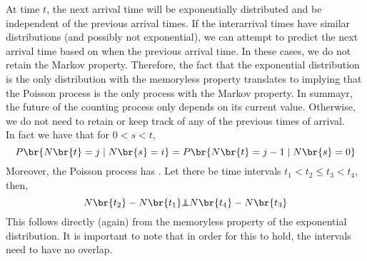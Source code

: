 \documentclass{article}
\newcommand{\indep}{\!\!\perp\!\!\!\!\perp\!\!}
\begin{document}
    \begin{center}
    \end{center}
    At time $t$, the next arrival time will be exponentially distributed and be independent of the previous arrival times. If the interarrival times have similar distributions (and possibly not exponential), we can attempt to predict the next arrival time based on when the previous arrival time. In these cases, we do not retain the Markov property. Therefore, the fact that the exponential distribution is the only distribution with the memoryless property translates to implying that the Poisson process is the only process with the Markov property. In summayr, the future of the counting process only depends on its current value. Otherwise, we do not need to retain or keep track of any of the previous times of arrival. \\

    In fact we have that for $0 < s < t$,
    \[ P\br{N\br{t} = j \mid N\br{s} = i} = P\br{N\br{t} = j-1 \mid N\br{s} = 0} \]
    Moreover, the Poisson process has . Let there be time intervals $t_1 < t_2 \leq t_3 < t_4$, then,
    \[ N\br{t_2} - N\br{t_1} \indep N\br{t_4} - N\br{t_3} \]
    This follows directly (again) from the memoryless property of the exponential distribution. It is important to note that in order for this to hold, the intervals need to have no overlap. \\
\end{document}
